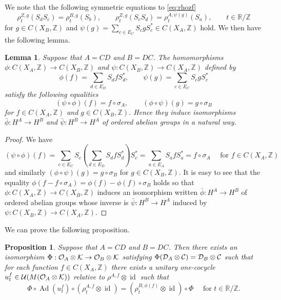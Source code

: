 \documentclass[11pt]{article}
\newtheorem{lemma}[theorem]{Lemma}
\newtheorem{proposition}[theorem]{Proposition}
\theoremstyle{plain}
\theoremstyle{definition}
\numberwithin{equation}{section}
\newcommand{\id}{\operatorname{id}}
\newcommand{\Ad}{\operatorname{Ad}}
\newcommand{\RZ}{\mathbb{R}/{\mathbb{Z}}}
\newcommand{\Z}{\mathbb{Z}}
\begin{document}
We note that the following symmetric equations to \eqref{eq:rhozf} 
\begin{equation}
\rho^{Z,g}_t(S_d S_c) =\rho^{B,g}_t(S_{b}), \qquad
\rho^{Z,g}_t(S_c S_d) =\rho^{A,\psi(g)}_t(S_{a}),
\qquad t \in \RZ \label{eq:rhozg}
\end{equation}
for 
$g \in C(X_B,\Z)$ and
$\psi(g) =\sum_{c \in E_C} S_c g S_c^* \in C(X_A,\Z)$
hold.
We then have the following lemma.
\begin{lemma}
Suppose that 
$A = CD$ and $B =DC$.
The homomorphisms
$\phi:C(X_A,\Z) \rightarrow  C(X_B,\Z)$
and
$\psi:C(X_B,\Z) \rightarrow  C(X_A,\Z)$
 defined by
\begin{equation*}
\phi(f) =\sum_{d \in E_D} S_d f S_d^*,\qquad
\psi(g) =\sum_{c \in E_C} S_c g S_c^* 
\end{equation*}
satisfy the following equalities
\begin{equation}
(\psi \circ \phi)(f) = f \circ \sigma_A,\qquad
(\phi \circ \psi)(g) = g \circ \sigma_B
\end{equation}
for $f \in C(X_A,\Z)$ and $g \in C(X_B,\Z)$.
Hence they induce isomorphisms
$\bar{\phi}:H^A\rightarrow H^B$
and
$\bar{\psi}:H^B\rightarrow H^A$
of ordered abelian groups in a natural way.
\end{lemma}
\begin{proof}
We have
\begin{equation*}
(\psi \circ \phi)(f) 
 = \sum_{c \in E_C} S_c (\sum_{d \in E_D} S_d f S_d^*) S_c^*
 = \sum_{a \in E_A} S_{a} f S_{a}^* 
= f \circ \sigma_A 
\quad
\text{ for } f \in C(X_A,\Z)
\end{equation*}
and
similarly 
$(\phi \circ \psi)(g) = g\circ \sigma_B
$
for
$ g \in C(X_B,\Z).$
It is easy to see that
the equality
$\phi(f - f \circ \sigma_A) = \phi(f) - \phi(f) \circ \sigma_B$
holds
so that 
$\phi:C(X_A,\Z) \rightarrow C(X_B,\Z)$ induces 
an isomorphism written
$\bar{\phi}:H^A\rightarrow H^B$
of ordered abelian groups whose inverse is 
$\bar{\psi}:H^B\rightarrow H^A$
induced by 
$\psi: C(X_B,\Z) \rightarrow C(X_A,\Z)$.
\end{proof}
We can prove the following proposition.
\begin{proposition}
Suppose that 
$A = CD$ and $B =DC$.
Then there exists an isomorphism
$\Phi:{{\mathcal{O}}_A}\otimes{\mathcal{K}} \rightarrow {{\mathcal{O}}_B}\otimes{\mathcal{K}}$ satisfying 
$\Phi({{\mathcal{D}}_A}\otimes{\mathcal{C}}) = {{\mathcal{D}}_B}\otimes{\mathcal{C}}$
such that
for each function
$f\in C(X_A,\Z)$
there exists a unitary one-cocycle
$u_t^f \in {{\mathcal{U}}}(M({{\mathcal{O}}_A}\otimes{\mathcal{K}}))$  relative to 
$\rho^{A,f} \otimes\id$
such that 
\begin{equation*}
\Phi \circ \Ad(u_t^f) \circ (\rho^{A,f}_t\otimes \id)
 = (\rho^{B,\phi(f)}_t\otimes\id) \circ \Phi
\quad
\text{ for }
 t \in \RZ.
\end{equation*}
\end{proposition}
\end{document}
